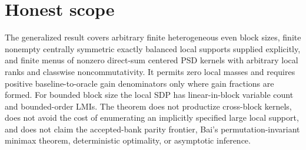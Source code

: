 \documentclass{article}
\begin{document}
\section{Honest scope}

The generalized result covers arbitrary finite heterogeneous even block sizes, finite nonempty centrally symmetric exactly balanced local supports supplied explicitly, and finite menus of nonzero direct-sum centered PSD kernels with arbitrary local ranks and classwise noncommutativity. It permits zero local masses and requires positive baseline-to-oracle gain denominators only where gain fractions are formed. For bounded block size the local SDP has linear-in-block variable count and bounded-order LMIs. The theorem does not productize cross-block kernels, does not avoid the cost of enumerating an implicitly specified large local support, and does not claim the accepted-bank parity frontier, Bai's permutation-invariant minimax theorem, deterministic optimality, or asymptotic inference.
\end{document}
